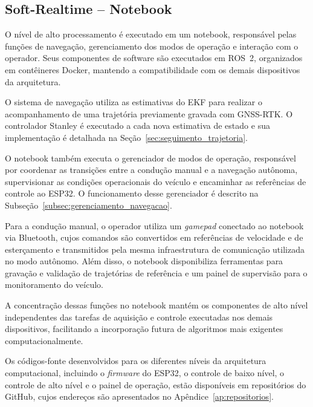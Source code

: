 \subsection{Soft-Realtime -- Notebook}

O nível de alto processamento é executado em um notebook, responsável pelas funções de navegação, gerenciamento dos modos de operação e interação com o operador. Seus componentes de software são executados em ROS~2, organizados em contêineres Docker, mantendo a compatibilidade com os demais dispositivos da arquitetura.

O sistema de navegação utiliza as estimativas do EKF para realizar o acompanhamento de uma trajetória previamente gravada com GNSS-RTK. O controlador Stanley é executado a cada nova estimativa de estado e sua implementação é detalhada na Seção~\ref{sec:seguimento_trajetoria}.

O notebook também executa o gerenciador de modos de operação, responsável por coordenar as transições entre a condução manual e a navegação autônoma, supervisionar as condições operacionais do veículo e encaminhar as referências de controle ao ESP32. O funcionamento desse gerenciador é descrito na Subseção~\ref{subsec:gerenciamento_navegacao}.

Para a condução manual, o operador utiliza um \textit{gamepad} conectado ao notebook via Bluetooth, cujos comandos são convertidos em referências de velocidade e de esterçamento e transmitidos pela mesma infraestrutura de comunicação utilizada no modo autônomo. Além disso, o notebook disponibiliza ferramentas para gravação e validação de trajetórias de referência e um painel de supervisão para o monitoramento do veículo.

A concentração dessas funções no notebook mantém os componentes de alto nível independentes das tarefas de aquisição e controle executadas nos demais dispositivos, facilitando a incorporação futura de algoritmos mais exigentes computacionalmente.

Os códigos-fonte desenvolvidos para os diferentes níveis da arquitetura computacional, incluindo o \textit{firmware} do ESP32, o controle de baixo nível, o controle de alto nível e o painel de operação, estão disponíveis em repositórios do GitHub, cujos endereços são apresentados no Apêndice~\ref{ap:repositorios}.


